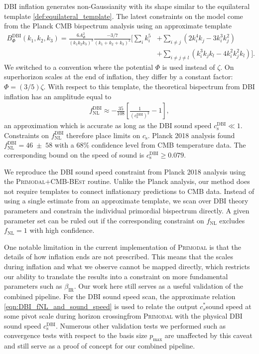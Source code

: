 DBI inflation generates non-Gaussianity with its shape similar to the equilateral template \eqref{def:equilateral_template}. The latest constraints on the model come from the Planck CMB bispectrum analysis using an approximate template 
\begin{align}
	B_\Phi^\text{DBI}(k_1,k_2,k_3) = \frac{6A_\Phi^2}{(k_1 k_2 k_3)^3} \frac{-3/7}{(k_1 + k_2 + k_3)^2} \bigg[ \sum_i k_i^5 &+ \sum_{i\neq j} (2k_i^4 k_j - 3k_i^3 k_j^2)  \nonumber \\
	&+ \sum_{i\neq j\neq l} (k_i^3 k_j k_l - 4k_i^2 k_j^2 k_l) \bigg]. \label{eqn:dbi_bispectrum_template}
\end{align}
We switched to a convention where the potential $\Phi$ is used instead of $\zeta$. On superhorizon scales at the end of inflation, they differ by a constant factor: $\Phi = (3/5)\zeta$. With respect to this template, the theoretical bispectrum from DBI inflation has an amplitude equal to
\begin{align}
	f_\text{NL}^\text{DBI} \approx - \frac{35}{108} \left[ \frac{1}{\left( c^\text{DBI}_\text{s} \right)^2} - 1 \right], \label{eqn:DBI_fNL_and_sound_speed}
\end{align}
an approximation which is accurate as long as the DBI sound speed $c^\text{DBI}_\text{s} \ll 1$. Constraints on $f_\text{NL}^\text{DBI}$ therefore place limits on $c_\text{s}$. Planck 2018 analysis \cite{PlanckCollaboration2018} found $f_\text{NL}^\text{DBI} = 46 \;\pm\; 58$ with a 68\% confidence level from CMB temperature data. The corresponding bound on the speed of sound is $c^\text{DBI}_\text{s} \ge 0.079$.

We reproduce the DBI sound speed constraint from Planck 2018 analysis using the \textsc{Primodal}$+$\textsc{CMB-BEst} routine. Unlike the Planck analysis, our method does not require templates to connect inflationary predictions to CMB data. Instead of using a single estimate from an approximate template, we scan over DBI theory parameters and constrain the individual primordial bispectrum directly. A given parameter set can be ruled out if the corresponding constraint on $f_\text{NL}$ excludes $f_\text{NL}=1$ with high confidence. 

One notable limitation in the current implementation of \textsc{Primodal} is that the details of how inflation ends are not prescribed. This means that the scales during inflation and what we observe cannot be mapped directly, which restricts our ability to translate the results into a constraint on more fundamental parameters such as $\beta_\text{IR}$. Our work here still serves as a useful validation of the combined pipeline. For the DBI sound speed scan, the approximate relation \eqref{eqn:DBI_fNL_and_sound_speed} is used to relate the output $c^*_s$\textemdash sound speed at some pivot scale during horizon crossing\textemdash from \textsc{Primodal} with the physical DBI sound speed $c^\text{DBI}_\text{s}$. Numerous other validation tests we performed such as convergence tests with respect to the basis size $p_\text{max}$ are unaffected by this caveat and still serve as a proof of concept for our combined pipeline.

